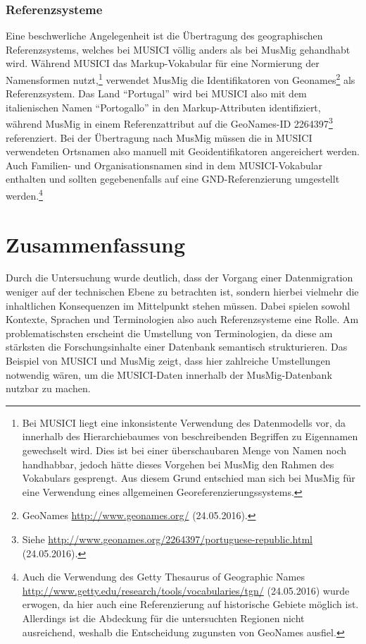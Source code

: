 \documentclass[a4paper,
fontsize=11pt,
oneside,
numbers=noperiodatend,
parskip=half-,
bibliography=totoc,
final
]{scrartcl}
\begin{document}
\subsubsection*{Referenzsysteme}\label{referenzsysteme}

Eine beschwerliche Angelegenheit ist die Übertragung des geographischen
Referenzsystems, welches bei MUSICI völlig anders als bei MusMig
gehandhabt wird. Während MUSICI das Markup-Vokabular für eine Normierung
der Namensformen nutzt,\footnote{Bei MUSICI liegt eine inkonsistente
  Verwendung des Datenmodells vor, da innerhalb des Hierarchiebaumes von
  beschreibenden Begriffen zu Eigennamen gewechselt wird. Dies ist bei
  einer überschaubaren Menge von Namen noch handhabbar, jedoch hätte
  dieses Vorgehen bei MusMig den Rahmen des Vokabulars gesprengt. Aus
  diesem Grund entschied man sich bei MusMig für eine Verwendung eines
  allgemeinen Georeferenzierungssystems.} verwendet MusMig die
Identifikatoren von Geonames\footnote{GeoNames
  \url{http://www.geonames.org/} (24.05.2016).} als Referenzsystem. Das
Land \enquote{Portugal} wird bei MUSICI also mit dem italienischen Namen
\enquote{Portogallo} in den Markup-Attributen identifiziert, während
MusMig in einem Referenzattribut auf die GeoNames-ID 2264397\footnote{Siehe
  \url{http://www.geonames.org/2264397/portuguese-republic.html}
  (24.05.2016).} referenziert. Bei der Übertragung nach MusMig müssen
die in MUSICI verwendeten Ortsnamen also manuell mit Geoidentifikatoren
angereichert werden. Auch Familien- und Organisationsnamen sind in dem
MUSICI-Vokabular enthalten und sollten gegebenenfalls auf eine
GND-Referenzierung umgestellt werden.\footnote{Auch die Verwendung des
  Getty Thesaurus of Geographic Names
  \url{http://www.getty.edu/research/tools/vocabularies/tgn/}
  (24.05.2016) wurde erwogen, da hier auch eine Referenzierung auf
  historische Gebiete möglich ist. Allerdings ist die Abdeckung für die
  untersuchten Regionen nicht ausreichend, weshalb die Entscheidung
  zugunsten von GeoNames ausfiel.}

\section*{Zusammenfassung}\label{zusammenfassung}

Durch die Untersuchung wurde deutlich, dass der Vorgang einer
Datenmigration weniger auf der technischen Ebene zu betrachten ist,
sondern hierbei vielmehr die inhaltlichen Konsequenzen im Mittelpunkt
stehen müssen. Dabei spielen sowohl Kontexte, Sprachen und Terminologien
also auch Referenzsysteme eine Rolle. Am problematischsten erscheint die
Umstellung von Terminologien, da diese am stärksten die
Forschungsinhalte einer Datenbank semantisch strukturieren. Das Beispiel
von MUSICI und MusMig zeigt, dass hier zahlreiche Umstellungen notwendig
wären, um die MUSICI-Daten innerhalb der MusMig-Datenbank nutzbar zu
machen.
\end{document}
